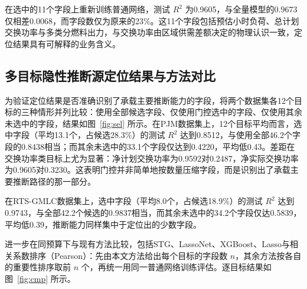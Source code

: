 \documentclass[UTF8,zihao=5,twoside,fontset=none]{ctexart}
\begin{document}
在选中的11个字段上重新训练普通网络，测试 $R^2$ 为0.9605，与全量模型的0.9673仅相差0.0068，而字段数仅为原来的23\%。这11个字段包括预估小时负荷、总计划交换功率与多类分燃料出力，与交换功率由区域供需差额决定的物理认识一致，定位结果具有可解释的业务含义。

\subsection{多目标隐性推断源定位结果与方法对比}

为验证定位结果是否准确识别了承载主要推断能力的字段，将两个数据集各12个目标的三种情形并列比较：使用全部候选字段、仅使用门控选中的字段、仅使用其余未选中的字段，结果如图~\ref{fig:sel} 所示。在PJM数据集上，12个目标平均而言，选中字段（平均13.1个，占候选28.3\%）的测试 $R^2$ 达到0.8512，与使用全部46.2个字段的0.8438相当；而其余未选中的33.1个字段仅达到0.4220，平均低0.43。差距在交换功率类目标上尤为显著：净计划交换功率为0.9592对0.2487，净实际交换功率为0.9605对0.3230。这表明门控并非简单地按数量压缩字段，而是识别出了承载主要推断路径的那一部分。

在RTS-GMLC数据集上，选中字段（平均8.0个，占候选18.9\%）的测试 $R^2$ 达到0.9743，与全部42.2个候选的0.9837相当，而其余未选中的34.2个字段仅达0.5839，平均低0.39，推断能力同样集中于定位出的少数字段。

进一步在同预算下与现有方法比较，包括STG\cite{ref-stg}、LassoNet\cite{ref-lassonet}、XGBoost\cite{ref-chen-xgboost}、Lasso\cite{ref-tibshirani-lasso}与相关系数排序（Pearson）：先由本文方法给出每个目标的字段数 $n$，其余方法按各自的重要性排序取前 $n$ 个，再统一用同一普通网络训练评估。逐目标结果如图~\ref{fig:cmp} 所示。
\end{document}
